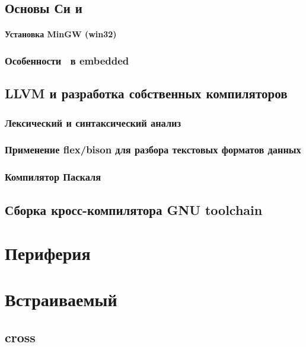 \chapter{Основы Си и \cpp}

\subsection{Установка MinGW (win32)}

\section{Особенности \cpp\ в embedded}

\chapter{LLVM и разработка собственных компиляторов}

\section{Лексический и синтаксический анализ}

\section{Применение flex/bison для разбора текстовых форматов данных}

\section{Компилятор Паскаля}

\chapter{Сборка кросс-компилятора GNU toolchain}



\part{Периферия}

\part{Встраиваемый \emlinux}

\chapter{cross}

